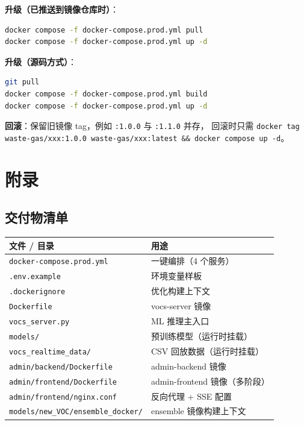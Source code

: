 \documentclass[UTF8,a4paper,11pt]{ctexart}
\begin{document}
\textbf{升级（已推送到镜像仓库时）}：

\begin{lstlisting}[language=bash]
docker compose -f docker-compose.prod.yml pull
docker compose -f docker-compose.prod.yml up -d
\end{lstlisting}

\textbf{升级（源码方式）}：

\begin{lstlisting}[language=bash]
git pull
docker compose -f docker-compose.prod.yml build
docker compose -f docker-compose.prod.yml up -d
\end{lstlisting}

\textbf{回滚}：保留旧镜像 tag，例如 \texttt{:1.0.0} 与 \texttt{:1.1.0} 并存，
回滚时只需 \texttt{docker tag waste-gas/xxx:1.0.0 waste-gas/xxx:latest \&\& docker compose up -d}。

\section{附录}

\subsection{交付物清单}

\begin{longtable}{L{6.0cm} L{8.0cm}}
\toprule
\textbf{文件 / 目录} & \textbf{用途} \\
\midrule
\endhead
\texttt{docker-compose.prod.yml}              & 一键编排（4 个服务） \\
\texttt{.env.example}                         & 环境变量样板 \\
\texttt{.dockerignore}                        & 优化构建上下文 \\
\texttt{Dockerfile}                           & vocs-server 镜像 \\
\texttt{vocs\_server.py}                      & ML 推理主入口 \\
\texttt{models/}                              & 预训练模型（运行时挂载） \\
\texttt{vocs\_realtime\_data/}                & CSV 回放数据（运行时挂载） \\
\texttt{admin/backend/Dockerfile}             & admin-backend 镜像 \\
\texttt{admin/frontend/Dockerfile}            & admin-frontend 镜像（多阶段） \\
\texttt{admin/frontend/nginx.conf}            & 反向代理 + SSE 配置 \\
\texttt{models/new\_VOC/ensemble\_docker/}    & ensemble 镜像构建上下文 \\
\bottomrule
\end{longtable}
\end{document}
